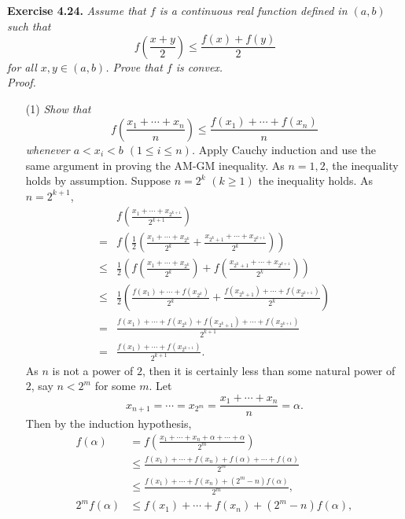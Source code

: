 \documentclass{article}
\begin{document}



\textbf{Exercise 4.24.}
\emph{Assume that $f$ is a continuous real function defined in $(a,b)$
such that
$$f\left( \frac{x+y}{2} \right)
\leq \frac{f(x)+f(y)}{2}$$
for all $x, y \in (a,b)$.
Prove that $f$ is convex.} \\

\emph{Proof.}
\begin{enumerate}
\item[(1)]
\emph{Show that
$$f\left( \frac{x_1 + \cdots + x_n}{n} \right)
\leq \frac{f(x_1) + \cdots + f(x_n)}{n}$$
whenever $a < x_i < b$ $(1 \leq i \leq n)$.}
Apply Cauchy induction and use the same argument in proving the AM-GM inequality.
As $n = 1, 2$, the inequality holds by assumption.
Suppose $n = 2^k$ $(k \geq 1)$ the inequality holds.
As $n = 2^{k+1}$,
\begin{align*}
&f\left( \frac{x_1 + \cdots + x_{2^{k+1}}}{2^{k+1}} \right) \\
=& f\left( \frac{1}{2} \left(\frac{x_1 + \cdots + x_{2^k}}{2^k}
  + \frac{x_{2^k+1} + \cdots + x_{2^{k+1}}}{2^k}\right) \right) \\
\leq& \frac{1}{2}
  \left(
    f\left(\frac{x_1 + \cdots + x_{2^k}}{2^k} \right)
    + f\left(\frac{x_{2^k+1} + \cdots + x_{2^{k+1}}}{2^k} \right)
  \right) \\
\leq& \frac{1}{2}
  \left(
    \frac{f(x_1) + \cdots + f(x_{2^k})}{2^k}
    + \frac{f(x_{2^k+1}) + \cdots + f(x_{2^{k+1}})}{2^k}
  \right) \\
=& \frac{f(x_1) + \cdots + f(x_{2^k}) + f(x_{2^k+1}) + \cdots + f(x_{2^{k+1}})}{2^{k+1}} \\
=& \frac{f(x_1) + \cdots + f(x_{2^{k+1}})}{2^{k+1}}.
\end{align*}
As $n$ is not a power of $2$,
then it is certainly less than some natural power of $2$, say $n < 2^m$ for some $m$.
Let
$$x_{n+1} = \cdots = x_{2^m} = \frac{x_1 + \cdots + x_n}{n} = \alpha.$$
Then by the induction hypothesis,
\begin{align*}
  f(\alpha)
  &= f\left( \frac{x_1 + \cdots + x_n + \alpha + \cdots + \alpha}{2^m} \right) \\
  &\leq \frac{f(x_1) + \cdots + f(x_n) + f(\alpha) + \cdots + f(\alpha)}{2^m} \\
  &\leq \frac{f(x_1) + \cdots + f(x_n) + (2^m - n)f(\alpha)}{2^m}, \\
  2^m f(\alpha)
  &\leq f(x_1) + \cdots + f(x_n) + (2^m - n)f(\alpha), \\

\end{align*}
\end{enumerate}
\end{document}
